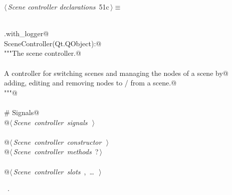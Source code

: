 \documentclass[
    a4paper,      %
    10pt,         %
    openright,    %
    notitlepage,  %
    parskip=half, %
]{scrreprt}       %
\theoremstyle{definition}                    %
\begin{document}
\begin{flushleft} \small
\begin{minipage}{\linewidth}\label{scrap78}\raggedright\small
{} $\langle\,${\itshape Scene controller declarations}\nobreak\ {\footnotesize {51c}}$\,\rangle\equiv$
\vspace{-1ex}
\begin{list}{}{} \item
\mbox{}\lstinline@@\\
\mbox{}\lstinline@common.with_logger@\\
\mbox{}\lstinline@class SceneController(Qt.QObject):@\\
\mbox{}\lstinline@    """The scene controller.@\\
\mbox{}\lstinline@@\\
\mbox{}\lstinline@    A controller for switching scenes and managing the nodes of a scene by@\\
\mbox{}\lstinline@    adding, editing and removing nodes to / from a scene.@\\
\mbox{}\lstinline@    """@\\
\mbox{}\lstinline@@\\
\mbox{}\lstinline@    # Signals@\\
\mbox{}\lstinline@    @\hbox{$\langle\,${\itshape Scene controller signals}\nobreak\ {\footnotesize {}}$\,\rangle$}\lstinline@@\\
\mbox{}\lstinline@@\\
\mbox{}\lstinline@    @\hbox{$\langle\,${\itshape Scene controller constructor}\nobreak\ {\footnotesize {}}$\,\rangle$}\lstinline@@\\
\mbox{}\lstinline@    @\hbox{$\langle\,${\itshape Scene controller methods}\nobreak\ {\footnotesize ?}$\,\rangle$}\lstinline@@\\
\mbox{}\lstinline@@\\
\mbox{}\lstinline@    @\hbox{$\langle\,${\itshape Scene controller slots}\nobreak\ {\footnotesize {}, \ldots\ }$\,\rangle$}\lstinline@@\\
\mbox{}\lstinline@@{\NWsep}
\end{list}
\vspace{-1.5ex}
\footnotesize
\begin{list}{}{\setlength{\itemsep}{-\parsep}\setlength{\itemindent}{-\leftmargin}}
\item \NWtxtMacroRefIn\ .

\item{}
\end{list}
\end{minipage}\vspace{4ex}
\end{flushleft}
\end{document}
